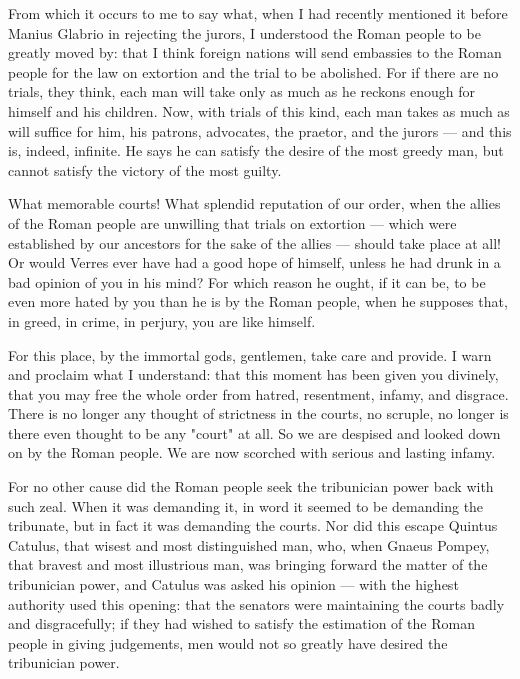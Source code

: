  From which it occurs to me to say what, when I had recently mentioned it before Manius Glabrio in rejecting the jurors, I understood the Roman people to be greatly moved by: that I think foreign nations will send embassies to the Roman people for the law on extortion and the trial to be abolished. For if there are no trials, they think, each man will take only as much as he reckons enough for himself and his children. Now, with trials of this kind, each man takes as much as will suffice for him, his patrons, advocates, the praetor, and the jurors --- and this is, indeed, infinite. He says he can satisfy the desire of the most greedy man, but cannot satisfy the victory of the most guilty.

 What memorable courts! What splendid reputation of our order, when the allies of the Roman people are unwilling that trials on extortion --- which were established by our ancestors for the sake of the allies --- should take place at all! Or would Verres ever have had a good hope of himself, unless he had drunk in a bad opinion of you in his mind? For which reason he ought, if it can be, to be even more hated by you than he is by the Roman people, when he supposes that, in greed, in crime, in perjury, you are like himself.

 For this place, by the immortal gods, gentlemen, take care and provide. I warn and proclaim what I understand: that this moment has been given you divinely, that you may free the whole order from hatred, resentment, infamy, and disgrace. There is no longer any thought of strictness in the courts, no scruple, no longer is there even thought to be any "court" at all. So we are despised and looked down on by the Roman people. We are now scorched with serious and lasting infamy.

 For no other cause did the Roman people seek the tribunician power back with such zeal. When it was demanding it, in word it seemed to be demanding the tribunate, but in fact it was demanding the courts. Nor did this escape Quintus Catulus, that wisest and most distinguished man, who, when Gnaeus Pompey, that bravest and most illustrious man, was bringing forward the matter of the tribunician power, and Catulus was asked his opinion --- with the highest authority used this opening: that the senators were maintaining the courts badly and disgracefully; if they had wished to satisfy the estimation of the Roman people in giving judgements, men would not so greatly have desired the tribunician power.

